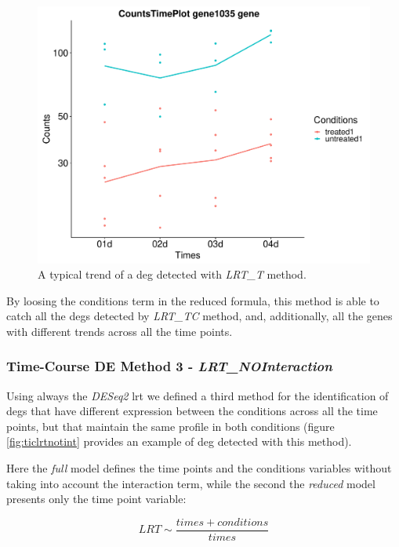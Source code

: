 \begin{figure}[H]
\centering
\includegraphics[width=\textwidth, keepaspectratio]{img/ticorser/de/trends/trend_t.pdf}
\caption[\gls{tic} LRT\_T trend]{A typical trend of a \gls{deg} detected with \textit{LRT\_T} method.}
\label{fig:ticlrtt}
\end{figure}

By loosing the conditions term in the reduced formula, this method is able to catch all the \glspl{deg} detected by \textit{LRT\_TC} method, and, additionally, all the genes with different trends across all the time points.

\subsubsection{Time-Course DE Method 3 - \textit{LRT\_NOInteraction}}
Using always the \textit{DESeq2} \gls{lrt} we defined a third method for the 
identification of \glspl{deg} that have different expression between the conditions across all the time points, but that maintain the same profile in both conditions (figure \ref{fig:ticlrtnotint} provides an example of \gls{deg} detected with this method).

Here the \textit{full} model defines the time points and the conditions variables without taking into account the interaction term, while the second the \textit{reduced} model presents only the time point variable:

\[LRT \sim \frac{times+conditions}{times}\]

